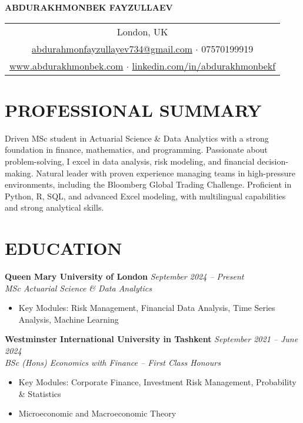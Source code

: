 \documentclass[11pt,a4paper]{article}
\begin{document}
\begin{center}
    {\LARGE\textbf{ABDURAKHMONBEK FAYZULLAEV}}\\[8pt]
    
    \begin{tabular}{c}
        London, UK \\
        \href{mailto:abdurakhmonbekfayzullaev@gmail.com}{abdurahmonfayzullayev734@gmail.com} $\cdot$ 07570199919 \\
        \href{https://www.abdurakhmonbek.com/}{www.abdurakhmonbek.com} $\cdot$ \href{https://linkedin.com/in/abdurakhmonbekf}{linkedin.com/in/abdurakhmonbekf}
    \end{tabular}
\end{center}

\vspace{10pt}

\section*{PROFESSIONAL SUMMARY}
Driven MSc student in Actuarial Science \& Data Analytics with a strong foundation in finance, mathematics, and programming. Passionate about problem-solving, I excel in data analysis, risk modeling, and financial decision-making. Natural leader with proven experience managing teams in high-pressure environments, including the Bloomberg Global Trading Challenge. Proficient in Python, R, SQL, and advanced Excel modeling, with multilingual capabilities and strong analytical skills.

\section*{EDUCATION}

\textbf{Queen Mary University of London} \hfill \textit{September 2024 -- Present}\\
\textit{MSc Actuarial Science \& Data Analytics}
\begin{itemize}
    \item Key Modules: Risk Management, Financial Data Analysis, Time Series Analysis, Machine Learning
\end{itemize}

\textbf{Westminster International University in Tashkent} \hfill \textit{September 2021 -- June 2024}\\
\textit{BSc (Hons) Economics with Finance -- First Class Honours}
\begin{itemize}
    \item Key Modules: Corporate Finance, Investment Risk Management, Probability \& Statistics
    \item Microeconomic and Macroeconomic Theory
\end{itemize}
\end{document}
